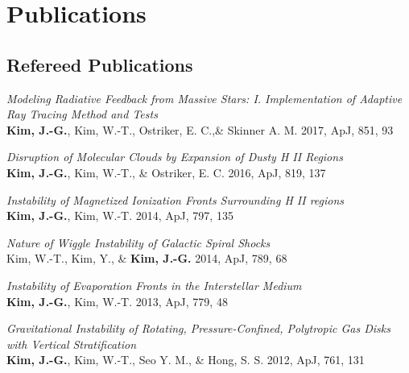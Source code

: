 \section{Publications}

\subsection{Refereed Publications
  \href{http://adsabs.harvard.edu/cgi-bin/nph-abs_connect?library&libname=Jeong-Gyu+Kim&libid=4b3ebd59ff}{\color{dodgerblue}{(ADS Link)}}}

\begin{benumerate}{6}
\item \textit{Modeling Radiative Feedback from Massive Stars: I.
  Implementation of Adaptive Ray Tracing Method and Tests}\\
\textbf{Kim, J.-G.}, Kim, W.-T., Ostriker, E. C.,\& Skinner A. M.
2017, ApJ, 851, 93
\item \textit{Disruption of Molecular Clouds by Expansion of Dusty H II
  Regions}\\
\textbf{Kim, J.-G.}, Kim, W.-T., \& Ostriker, E. C. 2016, ApJ, 819,
137
\item \textit{Instability of Magnetized Ionization Fronts
  Surrounding H II regions}\\
\textbf{Kim, J.-G.}, Kim, W.-T. 2014, ApJ, 797, 135
\item \textit{Nature of Wiggle Instability of Galactic Spiral
  Shocks}\\
Kim, W.-T., Kim, Y., \& \textbf{Kim, J.-G.} 2014, ApJ, 789, 68
\item \textit{Instability of Evaporation Fronts in the
  Interstellar Medium}\\
\textbf{Kim, J.-G.}, Kim, W.-T. 2013, ApJ, 779, 48
\item \textit{Gravitational Instability of Rotating,
    Pressure-Confined,
    Polytropic Gas Disks with Vertical Stratification}\\
  \textbf{Kim, J.-G.}, Kim, W.-T., Seo Y. M., \& Hong, S. S. 2012,
  ApJ, 761, 131
\end{benumerate}

